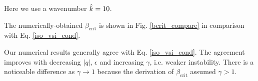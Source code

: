 Here we use a wavenumber $\hat{k}=10$. 







The numerically-obtained $\beta_\mathrm{crit}$ is shown in
Fig. \ref{bcrit_compare} in comparison with Eq. \ref{iso_vsi_cond}.  

Our numerical results generally agree with 
Eq. \ref{iso_vsi_cond}. The agreement improves with decreasing  $|q|$,
$\epsilon$ and increasing $\gamma$, i.e. weaker instability. 
There is a noticeable difference as $\gamma\to1$ because the
derivation of $\beta_\mathrm{crit}$ assumed $\gamma>1$.  

